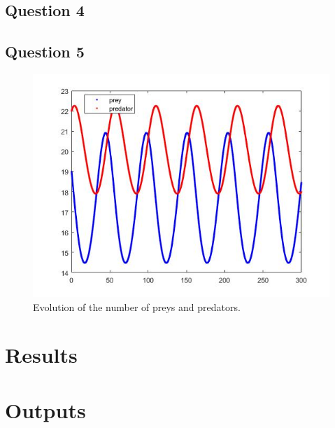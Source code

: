 \documentclass[a4paper, 11pt]{article}
\begin{document}
	\subsection*{Question 4}
	
	\subsection*{Question 5}
	\begin{figure}[H]
		\centering
		\includegraphics[width=\linewidth]{ex5.jpg}
		\caption{Evolution of the number of preys and predators.}
		\label{fig:ex5}
	\end{figure}
	
	
	
	
	
	\section*{Results}
	
	
	\section*{Outputs}
	
	
	
\end{document}
